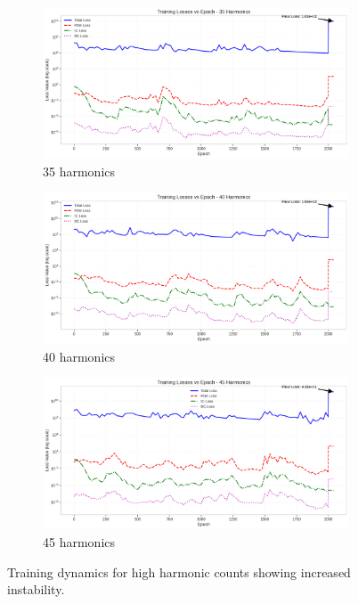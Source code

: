 \begin{figure}[H]
    \centering
    \begin{subfigure}[b]{0.32\textwidth}
        \centering
        \includegraphics[width=\textwidth]{figures/training_losses_35h.png}
        \caption{35 harmonics}
    \end{subfigure}
    \hfill
    \begin{subfigure}[b]{0.32\textwidth}
        \centering
        \includegraphics[width=\textwidth]{figures/training_losses_40h.png}
        \caption{40 harmonics}
    \end{subfigure}
    \hfill
    \begin{subfigure}[b]{0.32\textwidth}
        \centering
        \includegraphics[width=\textwidth]{figures/training_losses_45h.png}
        \caption{45 harmonics}
    \end{subfigure}
    \caption{Training dynamics for high harmonic counts showing increased instability.}
    \label{fig:training_high}
\end{figure}

